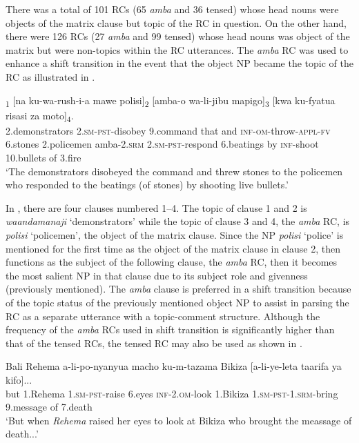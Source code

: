 \documentclass[output=paper,colorlinks,citecolor=brown]{langscibook}
\begin{document}
There was a total of 101 RCs (65 \textit{amba} \-and 36 tensed) whose head nouns were objects of the matrix clause but topic of the RC in question. On the other hand, there were 126 RCs (27 \textit{amba} and 99 tensed) whose head nouns was object of the matrix but were non-topics within the RC utterances. The \textit{amba} RC was used to enhance a shift transition in the event that the object NP became the topic of the RC as illustrated in .

\ea%
    \label{ex:mwamzandi:28}
    \textsubscript{1} [na ku-wa-rush-i-a mawe polisi]\textsubscript{2} [amba-o wa-li-jibu mapigo]\textsubscript{3} [kwa ku-fyatua risasi za moto]\textsubscript{4}.\\
            2.demonstrators \textsc{2.sm-pst-}disobey 9.command that and \textsc{inf-om-}throw\textsc{-appl-fv} 6.stones 2.policemen amba\textsc{-2.srm} \textsc{2.sm-pst-}respond 6.beatings by \textsc{inf-}shoot 10.bullets of 3.fire\\
    \glt    ‘The demonstrators disobeyed the command and threw stones to the policemen who responded to the beatings (of stones) by shooting live bullets.’
\z

In , there are four clauses numbered 1--4. The topic of clause 1 and 2 is \textit{waandamanaji} ‘demonstrators’ while the topic of clause 3 and 4, the \textit{amba} RC, is \textit{polisi} ‘policemen’, the object of the matrix clause. Since the NP \textit{polisi} ‘police’ is mentioned for the first time as the object of the matrix clause in clause 2, then functions as the subject of the following clause, the \textit{amba} RC, then it becomes the most salient NP in that clause due to its subject role and givenness (previously mentioned). The \textit{amba} clause is preferred in a shift transition because of the topic status of the previously mentioned object NP to assist in parsing the RC as a separate utterance with a topic-comment structure. Although the frequency of the \textit{amba} RCs used in shift transition is significantly higher than that of the tensed RCs, the tensed RC may also be used as shown in .

\ea%
    \label{ex:mwamzandi:29}
    \gll    Bali Rehema a-li-po-nyanyua macho ku-m-tazama Bikiza [a-li-ye-leta taarifa ya kifo]...\\
            but 1.Rehema \textsc{1.sm-pst-}raise 6.eyes \textsc{inf-2.om-}look 1.Bikiza  \textsc{1.sm-pst-1.srm-}bring 9.message of 7.death\\
    \glt    ‘But when \textit{Rehema} raised her eyes to look at Bikiza who brought the meassage of death...’
\z
\end{document}
